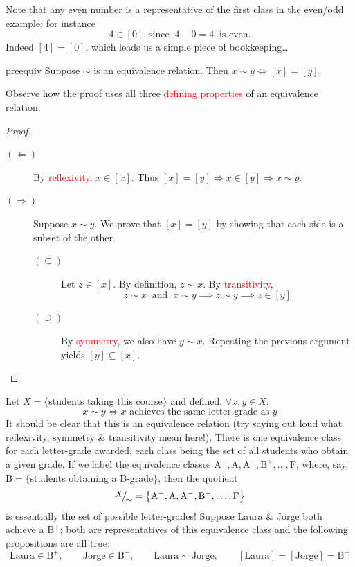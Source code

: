 Note that any even number is a representative of the first class in the even/odd example: for instance
\[
	4\in[0]\ \text{ since\ }\ 4-0=4\ \text{ is even.}
\]
Indeed $[4]=[0]$, which leads us a simple piece of bookkeeping\ldots


\begin{lemm}{}{preequiv}
	Suppose $\sim$ is an equivalence relation. Then $x\sim y\Longleftrightarrow [x]=[y]$.
\end{lemm}

Observe how the proof uses all three \textcolor{red}{defining properties} of an equivalence relation.

\begin{proof}
	\begin{description}
		\item[$(\Leftarrow)$] By \textcolor{red}{reflexivity}, $x\in[x]$. Thus $[x]=[y] \Longrightarrow x\in[y]\Longrightarrow x\sim y$.
		\item[$(\Rightarrow)$] Suppose $x\sim y$. We prove that $[x]=[y]$ by showing that each side is a subset of the other.
		\begin{description}
			\item[$(\subseteq)$] Let $z\in[x]$. By definition, $z\sim x$. By \textcolor{red}{transitivity},
			\[
				z\sim x\ \text{ and }\ x\sim y\implies z\sim y\implies z\in[y]
			\]
			\item[$(\supseteq)$] By \textcolor{red}{symmetry}, we also have $y\sim x$. Repeating the previous argument yields $[y]\subseteq [x]$.\qedhere
		\end{description}
	\end{description}
\end{proof}


\begin{example}{}{}
	Let $X=\{$students taking this course$\}$ and defined, $\forall x,y\in X$,
	\[
		x\sim y\iff x \text{ achieves the same letter-grade as $y$}
	\]
	It should be clear that this is an equivalence relation (try saying out loud what reflexivity, symmetry \& transitivity mean here!).	There is one equivalence class for each letter-grade awarded, each class being the set of all students who obtain a given grade. If we label the equivalence classes $\mathrm{A^+,A,A^-,B^+,\ldots,F}$, where, say, $\mathrm B=\{$students obtaining a B-grade$\}$, then the quotient
	\[
		\smash{\quotient{X}{\sim}}=\bigl\{\mathrm{A^+,A,A^-,B^+,\ldots,F}\bigr\}
	\]
	is essentially the set of possible letter-grades!	Suppose Laura \& Jorge both achieve a $\mathrm{B^+}$; both are representatives of this equivalence class and the following propositions are all true:
	\[
		\text{Laura}\in \mathrm{B^+},\qquad 
		\text{Jorge}\in\mathrm{B^+},\qquad 
		\text{Laura}\sim\text{Jorge},\qquad 
		[\text{Laura}]=[\text{Jorge}] =\mathrm{B^+}
	\] 
\end{example}


